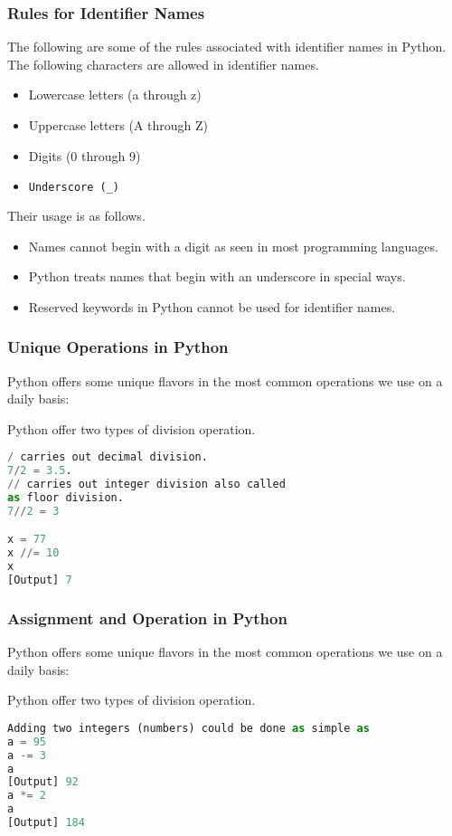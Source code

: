 \documentclass{beamer}
\begin{document}
\begin{frame}[fragile]
\frametitle{Rules for Identifier Names}
The following are some of the rules associated with identifier names in Python.
The following characters are allowed in identifier names.
\begin{itemize}
\item Lowercase letters (a through z)
\item Uppercase letters (A through Z)
\item Digits (0 through 9)
\item \begin{lstlisting}[language=Python]
Underscore (_)
\end{lstlisting}
\end{itemize}
Their usage is as follows.
\begin{itemize}
\item Names cannot begin with a digit as seen in most programming languages. 
\item Python treats names that begin with an underscore in special ways.
\item Reserved keywords in Python cannot be used for identifier names.
\end{itemize}
\end{frame}

\begin{frame}[fragile]
\frametitle{Unique Operations in Python}
Python offers some unique flavors in the most common operations we use on a daily basis:

Python offer two types of division operation.
\begin{lstlisting}[language=Python]
/ carries out decimal division.
7/2 = 3.5.
// carries out integer division also called 
as floor division.
7//2 = 3

x = 77
x //= 10
x
[Output] 7
\end{lstlisting}
\end{frame}

\begin{frame}[fragile]
\frametitle{Assignment and Operation in Python}
Python offers some unique flavors in the most common operations we use on a daily basis:

Python offer two types of division operation.
\begin{lstlisting}[language=Python]
Adding two integers (numbers) could be done as simple as 
a = 95
a -= 3
a
[Output] 92
a *= 2
a
[Output] 184
\end{lstlisting}
\end{frame}
\end{document}
